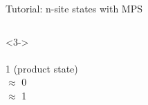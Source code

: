 \begin{frame}[fragile]{Tutorial: n-site states with MPS}
\begin{columns}
\begin{column}{4cm}
\begin{onlyenv}<3->
~\\
~\\
1 (product state) \\
$\approx$ 0 \\
$\approx$ 1
\end{onlyenv}

\end{column}

\end{columns}

\end{frame}
